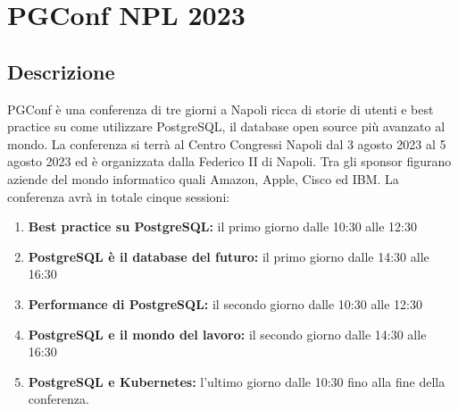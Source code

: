 \section{PGConf NPL 2023}
\subsection{Descrizione}
PGConf è una conferenza di tre giorni a Napoli ricca di storie di utenti e best practice su come utilizzare PostgreSQL, il database open source più avanzato al mondo. La conferenza si terrà al Centro Congressi Napoli dal 3 agosto 2023 al 5 agosto 2023 ed è organizzata dalla Federico II di Napoli. Tra gli sponsor figurano aziende del mondo informatico quali Amazon, Apple, Cisco ed IBM.
La conferenza avrà in totale cinque sessioni:
\begin{enumerate}
	\item \textbf{Best practice su PostgreSQL:} il primo giorno dalle 10:30 alle 12:30
	\item \textbf{PostgreSQL è il database del futuro:} il primo giorno dalle 14:30 alle 16:30
	\item \textbf{Performance di PostgreSQL:} il secondo giorno dalle 10:30 alle 12:30
	\item \textbf{PostgreSQL e il mondo del lavoro:} il secondo giorno dalle 14:30 alle 16:30
	\item \textbf{PostgreSQL e Kubernetes:} l'ultimo giorno dalle 10:30 fino alla fine della conferenza.
\end{enumerate}

